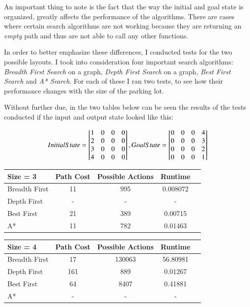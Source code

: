 \documentclass{article}
\begin{document}
An important thing to note is the fact that the way the initial and goal state is organized, greatly affects the performance of the algorithms. There are cases where certain search algorithms are not working because they are returning an \emph{empty} path and thus are not able to call any other functions.

In order to better emphasize these differences, I conducted tests for the two possible layouts. I took into consideration four important search algorithms: \emph{Breadth First Search} on a graph, \emph{Depth First Search} on a graph, \emph{Best First Search} and \emph{A* Search}. For each of these I ran two tests, to see how their performance changes with the size of the parking lot.

Without further due, in the two tables below can be seen the results of the tests conducted if the input and output state looked like this:

\begin{center}
    


\[ InitialState = 
\begin{bmatrix}
1 & 0 & 0 & 0\\
2 & 0 & 0 & 0\\
3 & 0 & 0 & 0\\
4 & 0 & 0 & 0\\
\end{bmatrix}
,\space \space  GoalState =  
\begin{bmatrix}
0 & 0 & 0 & 4\\
0 & 0 & 0 & 3\\
0 & 0 & 0 & 2\\
0 & 0 & 0 & 1\\
\end{bmatrix}
\]
\bigskip

\begin{tabular}{l*{3}{c}r}
Size = 3 & Path Cost & Possible Actions & Runtime\\
\hline
Breadth First   & 11 & 995 & 0.008072   \\
Depth First     & - & - & -   \\
Best First      & 21 & 389 & 0.00715  \\
A*              & 11 & 782 & 0.01463   \\
\end{tabular}

\bigskip

\begin{tabular}{l*{3}{c}r}
Size = 4 & Path Cost & Possible Actions & Runtime\\
\hline
Breadth First   & 17 & 130063 & 56.80981   \\
Depth First     & 161 & 889 & 0.01267   \\
Best First      & 64 & 8407 & 0.41881 \\
A*              & - & - & -   \\
\end{tabular}

\end{center}
\end{document}
